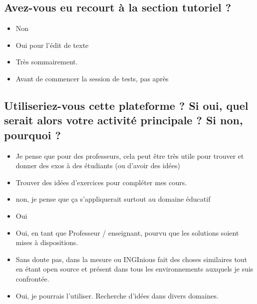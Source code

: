 \subsection*{Avez-vous eu recourt à la section tutoriel ?}

\begin{itemize}
    \item Non
    \item Oui pour l'édit de texte
    \item Très sommairement.
    \item Avant de commencer la session de tests, pas après
\end{itemize}

\subsection*{Utiliseriez-vous cette plateforme ? Si oui, quel serait alors votre activité principale ? Si non, pourquoi ?}

\begin{itemize}
    \item Je pense que pour des professeurs, cela peut être très utile pour trouver et donner des exos à des étudiants (ou d'avoir des idées)
    \item Trouver des idées d'exercices pour compléter mes cours.
    \item non, je pense que ça s'appliquerait surtout au domaine éducatif
    \item Oui
    \item Oui, en tant que Professeur / enseignant, pourvu que les solutions soient mises à dispositions.
    \item Sans doute pas, dans la mesure ou INGInious fait des choses similaires tout en étant open source et présent dans tous les environnements auxquels je suis confrontée.
    \item Oui, je pourrais l'utiliser. Recherche d'idées dans divers domaines.
\end{itemize}











